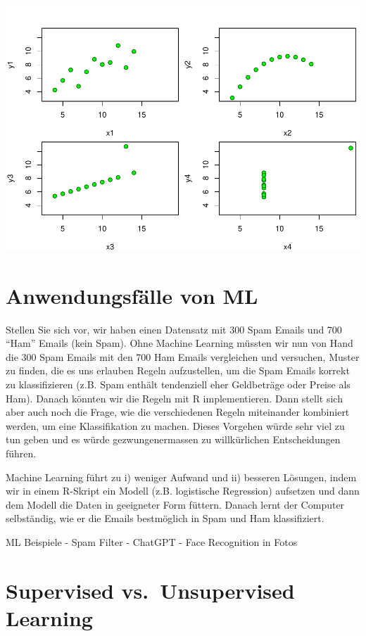 \documentclass[
]{book}
\begin{document}
\includegraphics{01-intro_files/figure-latex/anscombe-1.pdf}

\hypertarget{anwendungsfuxe4lle-von-ml}{%
\section{Anwendungsfälle von ML}\label{anwendungsfuxe4lle-von-ml}}

Stellen Sie sich vor, wir haben einen Datensatz mit 300 Spam Emails und 700 ``Ham'' Emails (kein Spam). Ohne Machine Learning müssten wir nun von Hand die 300 Spam Emails mit den 700 Ham Emails vergleichen und versuchen, Muster zu finden, die es uns erlauben Regeln aufzustellen, um die Spam Emails korrekt zu klassifizieren (z.B. Spam enthält tendenziell eher Geldbeträge oder Preise als Ham). Danach könnten wir die Regeln mit R implementieren. Dann stellt sich aber auch noch die Frage, wie die verschiedenen Regeln miteinander kombiniert werden, um eine Klassifikation zu machen. Dieses Vorgehen würde sehr viel zu tun geben und es würde gezwungenermassen zu willkürlichen Entscheidungen führen.

Machine Learning führt zu i) weniger Aufwand und ii) besseren Lösungen, indem wir in einem R-Skript ein Modell (z.B. logistische Regression) aufsetzen und dann dem Modell die Daten in geeigneter Form füttern. Danach lernt der Computer selbständig, wie er die Emails bestmöglich in Spam und Ham klassifiziert.

ML Beispiele
- Spam Filter
- ChatGPT
- Face Recognition in Fotos

\hypertarget{supervised-vs.-unsupervised-learning}{%
\section{Supervised vs.~Unsupervised Learning}\label{supervised-vs.-unsupervised-learning}}
\end{document}
